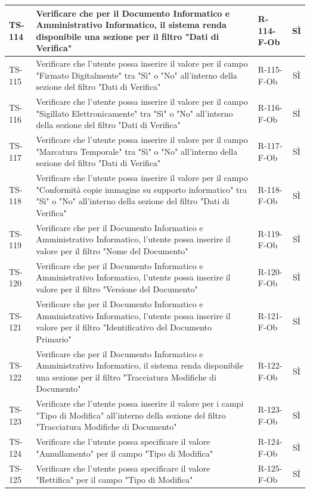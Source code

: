 \documentclass[a4paper,12pt]{article}
\begin{document}
\begin{longtable}{|p{1.5cm}|p{8.3cm}|p{2.4cm}|c|}
\hline
TS-114 & Verificare che per il Documento Informatico e Amministrativo Informatico, il sistema renda disponibile una sezione per il filtro "Dati di Verifica" & R-114-F-Ob & SÌ \\
\hline
TS-115 & Verificare che l'utente possa inserire il valore per il campo "Firmato Digitalmente" tra "Sì" o "No" all'interno della sezione del filtro "Dati di Verifica" & R-115-F-Ob & SÌ \\
\hline
TS-116 & Verificare che l'utente possa inserire il valore per il campo "Sigillato Elettronicamente" tra "Sì" o "No" all'interno della sezione del filtro "Dati di Verifica" & R-116-F-Ob & SÌ \\
\hline
TS-117 & Verificare che l'utente possa inserire il valore per il campo "Marcatura Temporale" tra "Sì" o "No" all'interno della sezione del filtro "Dati di Verifica" & R-117-F-Ob & SÌ \\
\hline
TS-118 & Verificare che l'utente possa inserire il valore per il campo "Conformità copie immagine su supporto informatico" tra "Sì" o "No" all'interno della sezione del filtro "Dati di Verifica" & R-118-F-Ob & SÌ \\
\hline
TS-119 & Verificare che per il Documento Informatico e Amministrativo Informatico, l'utente possa inserire il valore per il filtro "Nome del Documento" & R-119-F-Ob & SÌ \\
\hline
TS-120 & Verificare che per il Documento Informatico e Amministrativo Informatico, l'utente possa inserire il valore per il filtro "Versione del Documento" & R-120-F-Ob & SÌ \\
\hline
TS-121 & Verificare che per il Documento Informatico e Amministrativo Informatico, l'utente possa inserire il valore per il filtro "Identificativo del Documento Primario" & R-121-F-Ob & SÌ \\
\hline
TS-122 & Verificare che per il Documento Informatico e Amministrativo Informatico, il sistema renda disponibile una sezione per il filtro "Tracciatura Modifiche di Documento" & R-122-F-Ob & SÌ \\
\hline
TS-123 & Verificare che l'utente possa inserire il valore per i campi "Tipo di Modifica" all'interno della sezione del filtro "Tracciatura Modifiche di Documento" & R-123-F-Ob & SÌ \\
\hline
TS-124 & Verificare che l'utente possa specificare il valore "Annullamento" per il campo "Tipo di Modifica" & R-124-F-Ob & SÌ \\
\hline
TS-125 & Verificare che l'utente possa specificare il valore "Rettifica" per il campo "Tipo di Modifica" & R-125-F-Ob & SÌ \\

\end{longtable}
\end{document}
